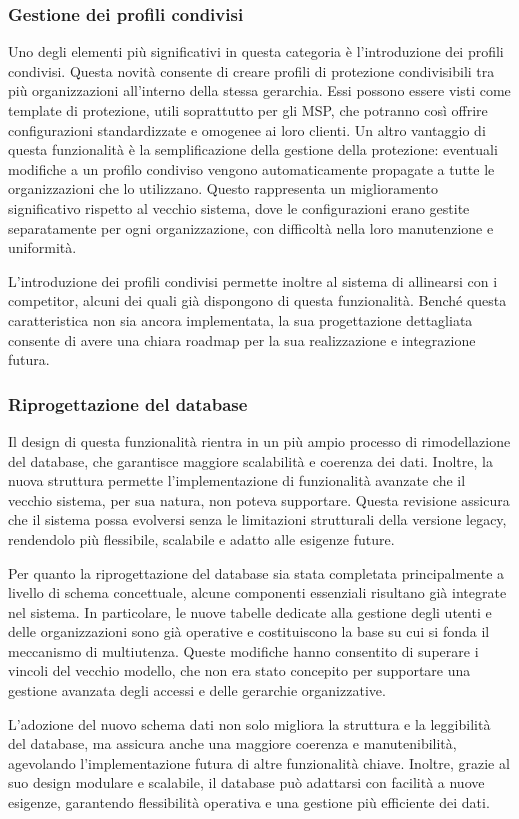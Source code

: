 \subsubsection{Gestione dei profili condivisi}
Uno degli elementi più significativi in questa categoria è l’introduzione dei profili condivisi. Questa novità consente di creare profili di protezione condivisibili tra più organizzazioni all'interno della stessa gerarchia. Essi possono essere visti come template di protezione, utili soprattutto per gli MSP, che potranno così offrire configurazioni standardizzate e omogenee ai loro clienti. Un altro vantaggio di questa funzionalità è la semplificazione della gestione della protezione: eventuali modifiche a un profilo condiviso vengono automaticamente propagate a tutte le organizzazioni che lo utilizzano. Questo rappresenta un miglioramento significativo rispetto al vecchio sistema, dove le configurazioni erano gestite separatamente per ogni organizzazione, con difficoltà nella loro manutenzione e uniformità.

L’introduzione dei profili condivisi permette inoltre al sistema di allinearsi con i competitor, alcuni dei quali già dispongono di questa funzionalità. Benché questa caratteristica non sia ancora implementata, la sua progettazione dettagliata consente di avere una chiara roadmap per la sua realizzazione e integrazione futura.

\subsubsection{Riprogettazione del database}
Il design di questa funzionalità rientra in un più ampio processo di rimodellazione del database, che garantisce maggiore scalabilità e coerenza dei dati. Inoltre, la nuova struttura permette l’implementazione di funzionalità avanzate che il vecchio sistema, per sua natura, non poteva supportare. Questa revisione assicura che il sistema possa evolversi senza le limitazioni strutturali della versione legacy, rendendolo più flessibile, scalabile e adatto alle esigenze future.

Per quanto la riprogettazione del database sia stata completata principalmente a livello di schema concettuale, alcune componenti essenziali risultano già integrate nel sistema. In particolare, le nuove tabelle dedicate alla gestione degli utenti e delle organizzazioni sono già operative e costituiscono la base su cui si fonda il meccanismo di multiutenza. Queste modifiche hanno consentito di superare i vincoli del vecchio modello, che non era stato concepito per supportare una gestione avanzata degli accessi e delle gerarchie organizzative.

L’adozione del nuovo schema dati non solo migliora la struttura e la leggibilità del database, ma assicura anche una maggiore coerenza e manutenibilità, agevolando l’implementazione futura di altre funzionalità chiave. Inoltre, grazie al suo design modulare e scalabile, il database può adattarsi con facilità a nuove esigenze, garantendo flessibilità operativa e una gestione più efficiente dei dati.
